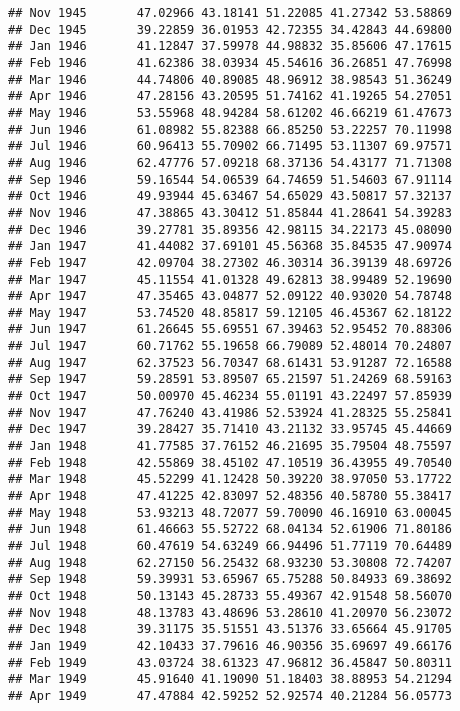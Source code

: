 \documentclass[
]{article}
\begin{document}
\begin{verbatim}
## Nov 1945       47.02966 43.18141 51.22085 41.27342 53.58869
## Dec 1945       39.22859 36.01953 42.72355 34.42843 44.69800
## Jan 1946       41.12847 37.59978 44.98832 35.85606 47.17615
## Feb 1946       41.62386 38.03934 45.54616 36.26851 47.76998
## Mar 1946       44.74806 40.89085 48.96912 38.98543 51.36249
## Apr 1946       47.28156 43.20595 51.74162 41.19265 54.27051
## May 1946       53.55968 48.94284 58.61202 46.66219 61.47673
## Jun 1946       61.08982 55.82388 66.85250 53.22257 70.11998
## Jul 1946       60.96413 55.70902 66.71495 53.11307 69.97571
## Aug 1946       62.47776 57.09218 68.37136 54.43177 71.71308
## Sep 1946       59.16544 54.06539 64.74659 51.54603 67.91114
## Oct 1946       49.93944 45.63467 54.65029 43.50817 57.32137
## Nov 1946       47.38865 43.30412 51.85844 41.28641 54.39283
## Dec 1946       39.27781 35.89356 42.98115 34.22173 45.08090
## Jan 1947       41.44082 37.69101 45.56368 35.84535 47.90974
## Feb 1947       42.09704 38.27302 46.30314 36.39139 48.69726
## Mar 1947       45.11554 41.01328 49.62813 38.99489 52.19690
## Apr 1947       47.35465 43.04877 52.09122 40.93020 54.78748
## May 1947       53.74520 48.85817 59.12105 46.45367 62.18122
## Jun 1947       61.26645 55.69551 67.39463 52.95452 70.88306
## Jul 1947       60.71762 55.19658 66.79089 52.48014 70.24807
## Aug 1947       62.37523 56.70347 68.61431 53.91287 72.16588
## Sep 1947       59.28591 53.89507 65.21597 51.24269 68.59163
## Oct 1947       50.00970 45.46234 55.01191 43.22497 57.85939
## Nov 1947       47.76240 43.41986 52.53924 41.28325 55.25841
## Dec 1947       39.28427 35.71410 43.21132 33.95745 45.44669
## Jan 1948       41.77585 37.76152 46.21695 35.79504 48.75597
## Feb 1948       42.55869 38.45102 47.10519 36.43955 49.70540
## Mar 1948       45.52299 41.12428 50.39220 38.97050 53.17722
## Apr 1948       47.41225 42.83097 52.48356 40.58780 55.38417
## May 1948       53.93213 48.72077 59.70090 46.16910 63.00045
## Jun 1948       61.46663 55.52722 68.04134 52.61906 71.80186
## Jul 1948       60.47619 54.63249 66.94496 51.77119 70.64489
## Aug 1948       62.27150 56.25432 68.93230 53.30808 72.74207
## Sep 1948       59.39931 53.65967 65.75288 50.84933 69.38692
## Oct 1948       50.13143 45.28733 55.49367 42.91548 58.56070
## Nov 1948       48.13783 43.48696 53.28610 41.20970 56.23072
## Dec 1948       39.31175 35.51551 43.51376 33.65664 45.91705
## Jan 1949       42.10433 37.79616 46.90356 35.69697 49.66176
## Feb 1949       43.03724 38.61323 47.96812 36.45847 50.80311
## Mar 1949       45.91640 41.19090 51.18403 38.88953 54.21294
## Apr 1949       47.47884 42.59252 52.92574 40.21284 56.05773

\end{verbatim}
\end{document}
